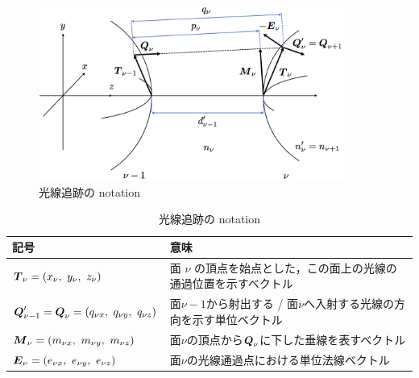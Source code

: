 \documentclass{jsarticle}
\begin{document}
\begin{figure}[b]
    \centering
    \includegraphics[width=10cm]{ray_tracing_notation.png}
    \caption{光線追跡の notation}
    \label{fig:ray_tracing_notation}
\end{figure}

\begin{table}[b]
    \centering
    \begin{tabular}{l|l}
        記号 & 意味 \\ \hline
        $\vb*{T}_\nu=\qty(x_\nu,\ y_\nu,\ z_\nu)$ & 面 $\nu$ の頂点を始点とした，この面上の光線の通過位置を示すベクトル \\
        $\vb*{Q}_{\nu-1}'=\vb*{Q}_\nu=\qty(q_{\nu x},\ q_{\nu y},\ q_{\nu z})$ & 面$\nu-1$から射出する / 面$\nu$へ入射する光線の方向を示す単位ベクトル\\
        $\vb*{M}_\nu=\qty(m_{\nu x},\ m_{\nu y},\ m_{\nu z})$& 面$\nu$の頂点から$\vb*{Q}_\nu$に下した垂線を表すベクトル \\
        $\vb*{E}_\nu=\qty(e_{\nu x},\ e_{\nu y},\ e_{\nu z})$& 面$\nu$の光線通過点における単位法線ベクトル
    \end{tabular}
    \caption{光線追跡の notation}
    \label{table:ray_tracing_notation}
\end{table}
\end{document}
